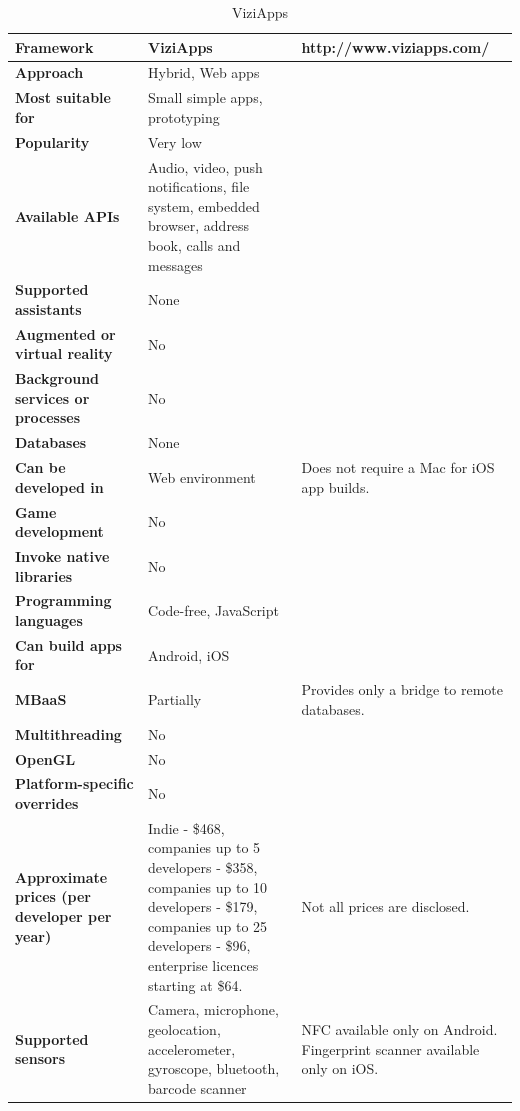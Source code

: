 \documentclass[english,master,public,dept460,male,cpdeclaration,oneside]{diploma}
\begin{document}
\begin{table}[!h]
	\centering
	\caption{ViziApps}
	\begin{tabular}{p{} | p{} | p{}}
		\toprule		
		\textbf{Framework} & \textbf{ViziApps} & http://www.viziapps.com/ \\
		\midrule
		\textbf{Approach} & Hybrid, Web apps & \\			
		\midrule	
		\textbf{Most suitable for} & Small simple apps, prototyping & \\
		\midrule
		\textbf{Popularity} & Very low & \\			
		\midrule
		\textbf{Available APIs} & Audio, video, push notifications, file system, embedded browser, address book, calls and messages & \\			
		\midrule
		\textbf{Supported assistants} & None & \\			
		\midrule
		\textbf{Augmented or virtual reality} & No & \\			
		\midrule
		\textbf{Background services or processes} & No & \\			
		\midrule
		\textbf{Databases} & None & \\			
		\midrule
		\textbf{Can be developed in} & Web environment & Does not require a Mac for iOS app builds. \\			
		\midrule
		\textbf{Game development} & No & \\			
		\midrule
		\textbf{Invoke native libraries} & No & \\			
		\midrule
		\textbf{Programming languages} & Code-free, JavaScript & \\			
		\midrule
		\textbf{Can build apps for} & Android, iOS & \\			
		\midrule
		\textbf{MBaaS} & Partially & Provides only a bridge to remote databases. \\			
		\midrule
		\textbf{Multithreading} & No & \\			
		\midrule
		\textbf{OpenGL} & No & \\			
		\midrule
		\textbf{Platform-specific overrides} & No & \\			
		\midrule
		\textbf{Approximate prices (per developer per year)} & Indie - \$468, companies up to 5 developers - \$358, companies up to 10 developers - \$179, companies up to 25 developers - \$96, enterprise licences starting at \$64. & Not all prices are disclosed. \\			
		\midrule
		\textbf{Supported sensors} & Camera, microphone, geolocation, accelerometer, gyroscope, bluetooth, barcode scanner & NFC available only on Android. Fingerprint scanner available only on iOS. \\			
		\midrule
	\end{tabular}
\end{table}
\end{document}
